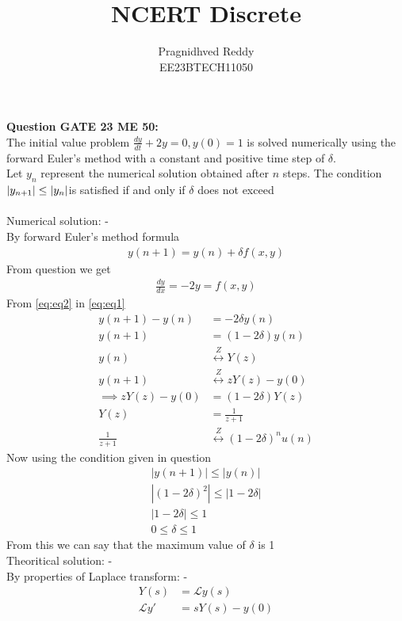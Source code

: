 \documentclass[journal,12pt,twocolumn]{IEEEtran}
\title{NCERT Discrete}
\author{Pragnidhved Reddy\\EE23BTECH11050}
\date{}
\begin{document}
\maketitle
\newpage
\bigskip
\textbf{Question GATE 23 ME 50:}\\
The initial value problem
$\frac{dy}{dt}+2y=0, y(0)=1 $
is solved numerically using the forward Euler's method with a constant and positive time step of $\delta $.\\
Let $y_n$ represent the numerical solution obtained after $n$ steps. The condition $\left\vert y_{n+1}\right\vert \leq \left\vert y_n\right\vert$is satisfied if and only if $\delta$ does not exceed\\
\solution \\
Numerical solution: -\\
By forward Euler's method formula 
\begin{align}
\label{eq:eq1}
    y(n+1)=y(n)+\delta  f(x,y)
\end{align}
From question we get
\begin{align}
\label{eq:eq2}
\frac{dy}{dx}=-2y=f(x,y)
\end{align}
From \eqref{eq:eq2} in \eqref{eq:eq1}
\begin{align}
y(n+1)-y(n)&=-2\delta y(n)\\
y(n+1)&=(1-2\delta)y(n)\\
y(n)&\overset{Z}\longleftrightarrow Y(z)\\
y(n+1)&\overset{Z}\longleftrightarrow zY(z)-y(0)\\
\implies zY(z)-y(0)&=(1-2\delta)Y(z)\\
Y(z)&=\frac{1}{z+1}\\
\frac{1}{z+1}&\overset{Z}\longleftrightarrow (1-2\delta)^{n}u(n)
\end{align}
Now using the condition given in question
\begin{align}
|y(n+1)| \leq |y(n)|\\
|(1-2\delta)^2| \leq |1-2\delta|\\
|1-2\delta| \leq 1 \\
0 \leq \delta \leq 1
\end{align}
From this we can say that the maximum value of $\delta  $ is 1\\
Theoritical solution: -\\
By properties of Laplace transform: -
\begin{align}
\label{eq:eq8}
Y(s)&=\mathcal{L}y(s)\\
\label{eq:eq9}
\mathcal{L}y'&=sY(s)-y(0)
\end{align}
\end{document}
